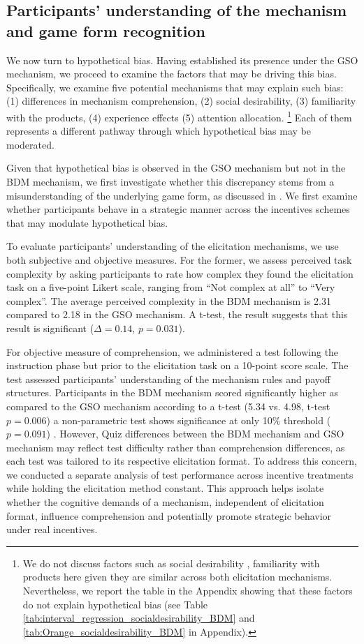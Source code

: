 \documentclass[12pt]{article}
\begin{document}
\subsection{Participants' understanding of the mechanism and game form recognition}
We now turn to hypothetical bias. Having established its presence under the GSO mechanism, we proceed to examine the factors that may be driving this bias. Specifically, we examine five potential mechanisms that may explain such bias: (1) differences in mechanism comprehension,  (2) social desirability, (3) familiarity with the products,  (4) experience effects (5) attention allocation. \footnote{We do not discuss factors such as social desirability \citep{norwood2011social, entem2022using, lopez2021social, bursztyn2025social}, familiarity with products \citep{veettil_hypothetical_2024} here given they are similar across both elicitation mechanisms. Nevertheless, we report the table in the Appendix showing that these factors do not explain hypothetical bias (see Table \ref{tab:interval_regression_socialdesirability_BDM} and \ref{tab:Orange_socialdesirability_BDM}  in Appendix).} Each of them represents a different pathway through which hypothetical bias may be moderated.

Given that hypothetical bias is observed in the GSO mechanism but not in the BDM mechanism, we first investigate whether this discrepancy stems from a misunderstanding of the underlying game form, as discussed in \citet{cason_misconceptions_2014}. We first examine whether participants behave in a strategic manner across the incentives schemes that may modulate hypothetical bias.

To evaluate participants’ understanding of the elicitation mechanisms, we use both subjective and objective measures. For the former, we assess perceived task complexity by asking participants to rate how complex they found the elicitation task on a five-point Likert scale, ranging from “Not complex at all” to “Very complex”. 
The average perceived complexity in the BDM mechanism is 2.31 compared to 2.18 in the GSO mechanism. A  t-test, the result suggests that this result is significant (\(\Delta = 0.14\), \(p =0.031\)). 


For objective measure of comprehension, we administered a test following the instruction phase but prior to the elicitation task on a 10-point score scale. The test assessed participants’ understanding of the mechanism rules and payoff structures. Participants in the BDM mechanism scored significantly higher as compared to the GSO mechanism according to a t-test (5.34 vs. 4.98, t-test $p=0.006$) a non-parametric test shows significance at only 10\% threshold ($p=0.091$) .  However, Quiz differences between the BDM mechanism and GSO mechanism may reflect test difficulty rather than comprehension differences, as each test was tailored to its respective elicitation format.
To address this concern, we conducted a separate analysis of test performance across incentive treatments while holding the elicitation method constant. This approach helps isolate whether the cognitive demands of a mechanism, independent of elicitation format, influence comprehension and potentially promote strategic behavior under real  incentives.
\end{document}
